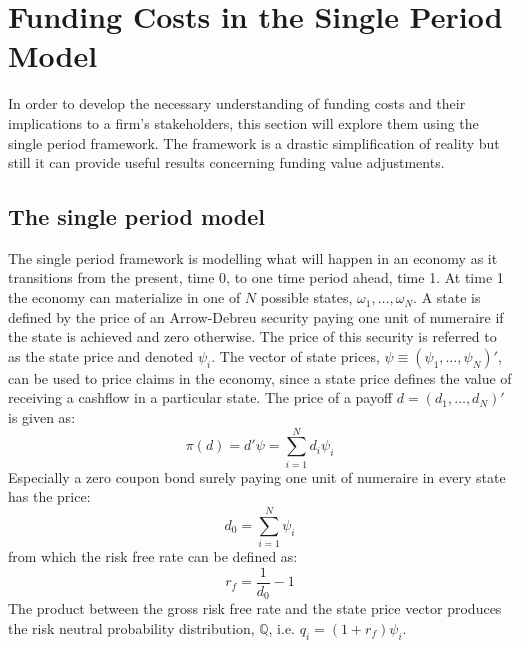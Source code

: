 \documentclass[../main.tex]{subfiles}
\begin{document}
    \section{Funding Costs in the Single Period Model}
        In order to develop the necessary understanding of funding costs and their implications to a firm's stakeholders, this section will explore them using the single period framework.
        The framework is a drastic simplification of reality but still it can provide useful results concerning funding value adjustments.

    \subsection{The single period model}
        The single period framework is modelling what will happen in an economy as it transitions from the present, time 0, to one time period ahead, time 1.
        At time 1 the economy can materialize in one of $N$ possible states, $\omega_{1}, \dots, \omega_{N}$.
        A state is defined by the price of an Arrow-Debreu security paying one unit of numeraire if the state is achieved and zero otherwise.
        The price of this security is referred to as the state price and denoted $\psi_{i}$.
        The vector of state prices, $\psi \equiv \left(\psi_{1}, \dots, \psi_{N}\right)'$, can be used to price claims in the economy, since a state price defines the value of receiving a cashflow in a particular state.
        The price of a payoff $d=\left(d_{1}, \dots, d_{N}\right)'$ is given as:
            \begin{equation}
                \pi(d) = d'\psi = \sum_{i=1}^{N} d_{i}\psi_{i}
            \end{equation}
        Especially a zero coupon bond surely paying one unit of numeraire in every state has the price:
            \begin{equation}
                d_{0} = \sum_{i=1}^{N} \psi_{i}
            \end{equation}
        from which the risk free rate can be defined as:
            \begin{equation}
                r_{f} = \frac{1}{d_{0}} - 1
            \end{equation}
        The product between the gross risk free rate and the state price vector produces the risk neutral probability distribution, $\mathbb{Q}$, i.e. $q_{i} = (1 + r_{f})\psi_{i}$.
\end{document}
